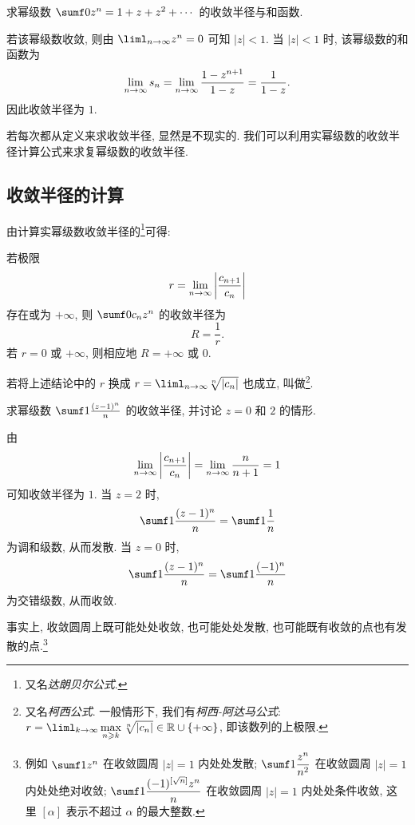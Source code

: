 \begin{example}
  求幂级数 $\sumf0 z^n=1+z+z^2+\cdots$ 的收敛半径与和函数.
\end{example}

\begin{solution}
  若该幂级数收敛, 则由 $\liml_{n\ra\infty}z^n=0$ 可知 $|z|<1$.
  当 $|z|<1$ 时, 该幂级数的和函数为
  \[
     \lim_{n\rightarrow\infty}s_n
    =\lim_{n\rightarrow\infty}\frac{1-z^{n+1}}{1-z}
    =\frac1{1-z}.
  \]
  因此收敛半径为 $1$.
\end{solution}

若每次都从定义来求收敛半径, 显然是不现实的.
我们可以利用实幂级数的收敛半径计算公式来求复幂级数的收敛半径.


\subsection{收敛半径的计算}

由计算实幂级数收敛半径的\footnote{又名\emph{达朗贝尔公式}.}可得:
\begin{theorem}
  若极限
  \[
    r=\lim_{n\rightarrow\infty}\left|\frac{c_{n+1}}{c_n}\right|
  \]
  存在或为 $+\infty$, 则 $\sumf0 c_nz^n$ 的收敛半径为
  \[
    R=\dfrac1r.
  \]
  若 $r=0$ 或 $+\infty$, 则相应地 $R=+\infty$ 或 $0$.
\end{theorem}

若将上述结论中的 $r$ 换成 \alert{$r=\liml_{n\ra\infty}\sqrt[n]{\abs{c_n}}$} 也成立, 叫做\footnote{
  又名\emph{柯西公式}.
  一般情形下, 我们有\emph{柯西-阿达马公式}: 
  $r=\liml_{k\ra\infty}\max\limits_{n\ge k}\sqrt[n]{\abs{c_n}}\in\BR\cup\{+\infty\}$, 即该数列的上极限.
}.

\begin{example}
  求幂级数 $\sumf1 \frac{(z-1)^n}n$ 的收敛半径, 并讨论 $z=0$ 和 $2$ 的情形.
\end{example}

\begin{solution}
  由
  \[
     \lim_{n\rightarrow\infty}\left|\frac{c_{n+1}}{c_n}\right|
    =\lim_{n\rightarrow\infty}\frac n{n+1}=1
  \]
  可知收敛半径为 $1$.
  当 $z=2$ 时,
  \[
    \sumf1 \frac{(z-1)^n}n=\sumf1 \frac1n
  \]
  为调和级数, 从而发散.
  当 $z=0$ 时,
  \[
    \sumf1 \frac{(z-1)^n}n=\sumf1 \frac{(-1)^n}n
  \]
  为交错级数, 从而收敛.
\end{solution}

事实上, \alert{收敛圆周上既可能处处收敛, 也可能处处发散, 也可能既有收敛的点也有发散的点}.\footnote{
  例如 $\sumf1 z^n$ 在收敛圆周 $|z|=1$ 内处处发散; $\sumf1 \dfrac{z^n}{n^2}$ 在收敛圆周 $|z|=1$ 内处处绝对收敛; $\sumf1 \dfrac{(-1)^{[\sqrt n]}z^n}{n}$ 在收敛圆周 $|z|=1$ 内处处条件收敛, 这里 $[\alpha]$ 表示不超过 $\alpha$ 的最大整数.
}

